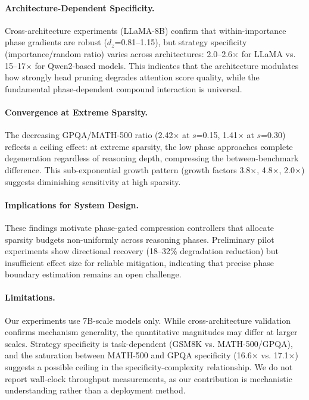 \documentclass[11pt,a4paper]{article}
\begin{document}
\paragraph{Architecture-Dependent Specificity.}
Cross-architecture experiments (LLaMA-8B) confirm that within-importance phase gradients are robust ($d_z$=0.81--1.15), but strategy specificity (importance/random ratio) varies across architectures: 2.0--2.6$\times$ for LLaMA vs. 15--17$\times$ for Qwen2-based models. This indicates that the architecture modulates how strongly head pruning degrades attention score quality, while the fundamental phase-dependent compound interaction is universal.

\paragraph{Convergence at Extreme Sparsity.}
The decreasing GPQA/MATH-500 ratio (2.42$\times$ at $s$=0.15, 1.41$\times$ at $s$=0.30) reflects a ceiling effect: at extreme sparsity, the low phase approaches complete degeneration regardless of reasoning depth, compressing the between-benchmark difference. This sub-exponential growth pattern (growth factors 3.8$\times$, 4.8$\times$, 2.0$\times$) suggests diminishing sensitivity at high sparsity.

\paragraph{Implications for System Design.}
These findings motivate phase-gated compression controllers that allocate sparsity budgets non-uniformly across reasoning phases. Preliminary pilot experiments show directional recovery (18--32\% degradation reduction) but insufficient effect size for reliable mitigation, indicating that precise phase boundary estimation remains an open challenge.

\paragraph{Limitations.}
Our experiments use 7B-scale models only. While cross-architecture validation confirms mechanism generality, the quantitative magnitudes may differ at larger scales. Strategy specificity is task-dependent (GSM8K vs. MATH-500/GPQA), and the saturation between MATH-500 and GPQA specificity (16.6$\times$ vs. 17.1$\times$) suggests a possible ceiling in the specificity-complexity relationship. We do not report wall-clock throughput measurements, as our contribution is mechanistic understanding rather than a deployment method.
\end{document}
